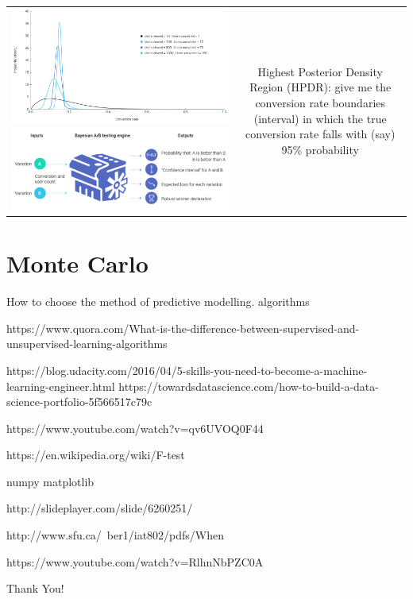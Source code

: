 \documentclass{beamer}
\begin{document}
\begin{frame}[allowframebreaks]
\begin{tabular}{c|c}
\includegraphics[scale=0.2]{figs/abtestbayes} \includegraphics[scale=0.3]{figs/abtestbayesengine}
& Highest Posterior Density Region (HPDR): give me the conversion rate boundaries (interval) in which the true conversion rate falls with (say) 95\% probability
\end{tabular}


\end{frame}

\section{Monte Carlo}


\begin{frame}
	How to choose the method of predictive modelling.
	algorithms

	https://www.quora.com/What-is-the-difference-between-supervised-and-unsupervised-learning-algorithms
	
	https://blog.udacity.com/2016/04/5-skills-you-need-to-become-a-machine-learning-engineer.html
	https://towardsdatascience.com/how-to-build-a-data-science-portfolio-5f566517c79c
		
	https://www.youtube.com/watch?v=qv6UVOQ0F44
	
	https://en.wikipedia.org/wiki/F-test
	
	numpy matplotlib
	
	http://slideplayer.com/slide/6260251/
	
	http://www.sfu.ca/~ber1/iat802/pdfs/When%
	
	https://www.youtube.com/watch?v=RlhnNbPZC0A
\end{frame}



\begin{frame}

\end{frame}

\begin{frame}
	Thank You!
\end{frame}
\end{document}
